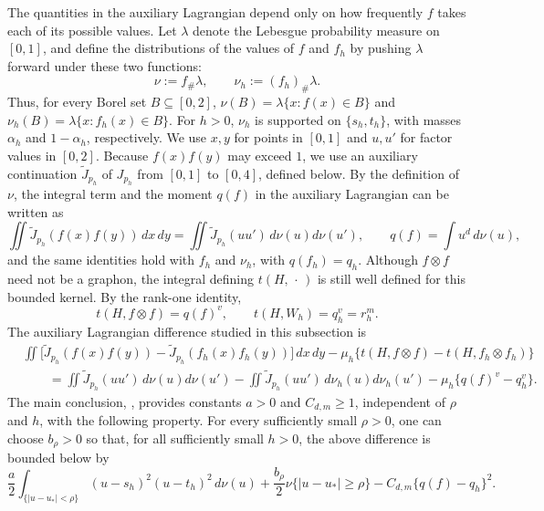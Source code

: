 The quantities in the auxiliary Lagrangian depend only on how frequently $f$
takes each of its possible values.  Let $\lambda$ denote the Lebesgue
probability measure on $[0,1]$, and define the distributions of the values of
$f$ and $f_h$ by pushing $\lambda$ forward under these two functions:
\begin{equation*}
  \nu:=f_\#\lambda,
  \qquad
  \nu_h:=(f_h)_\#\lambda.
\end{equation*}
Thus, for every Borel set $B\subseteq[0,2]$,
$\nu(B)=\lambda\{x:f(x)\in B\}$ and $\nu_h(B)=\lambda\{x:f_h(x)\in B\}$.
For $h>0$, $\nu_h$ is supported on $\{s_h,t_h\}$, with masses
$\alpha_h$ and $1-\alpha_h$, respectively.
We use $x,y$ for points in $[0,1]$ and $u,u'$ for factor values in $[0,2]$.
Because $f(x)f(y)$ may exceed $1$, we use an auxiliary
continuation $\widetilde J_{p_h}$ of $J_{p_h}$ from $[0,1]$ to $[0,4]$, defined
below.
By the definition of $\nu$, the integral term and the moment
$q(f)$ in the auxiliary Lagrangian can be written as
\begin{equation*}
  \iint \widetilde J_{p_h}(f(x)f(y))\,dx\,dy
  =\iint \widetilde J_{p_h}(uu')\,d\nu(u)d\nu(u'),
  \qquad
  q(f)=\int u^d\,d\nu(u),
\end{equation*}
and the same identities hold with $f_h$ and $\nu_h$, with
$q(f_h)=q_h$.  Although $f\otimes f$ need not be a graphon, the integral
defining $t(H,\,\cdot\,)$ is still well defined for this bounded kernel.
By the rank-one identity,
\begin{equation*}
  t(H,f\otimes f)=q(f)^v,
  \qquad
  t(H,W_h)=q_h^v=r_h^m.
\end{equation*}
The auxiliary Lagrangian difference studied in this subsection is
\begin{align*}
  &\iint \bigl[\widetilde J_{p_h}(f(x)f(y))
    -\widetilde J_{p_h}(f_h(x)f_h(y))\bigr]\,dx\,dy
    -\mu_h\bigl\{t(H,f\otimes f)-t(H,f_h\otimes f_h)\bigr\}\\
  &\qquad=\iint \widetilde J_{p_h}(uu')\,d\nu(u)d\nu(u')
    -\iint \widetilde J_{p_h}(uu')\,d\nu_h(u)d\nu_h(u')
    -\mu_h\{q(f)^v-q_h^v\}.
\end{align*}
The main conclusion, , provides
constants $a>0$ and $C_{d,m}\ge1$, independent of $\rho$ and $h$, with the
following property.  For every sufficiently small $\rho>0$, one can choose
$b_\rho>0$ so that, for all sufficiently small $h>0$, the above difference is
bounded below by
\begin{equation*}
  \frac{a}{2}
  \int_{\{|u-u_*|<\rho\}}(u-s_h)^2(u-t_h)^2\,d\nu(u)
  +\frac{b_\rho}{2}\nu\{|u-u_*|\ge\rho\}
  -C_{d,m}\{q(f)-q_h\}^2.
\end{equation*}
